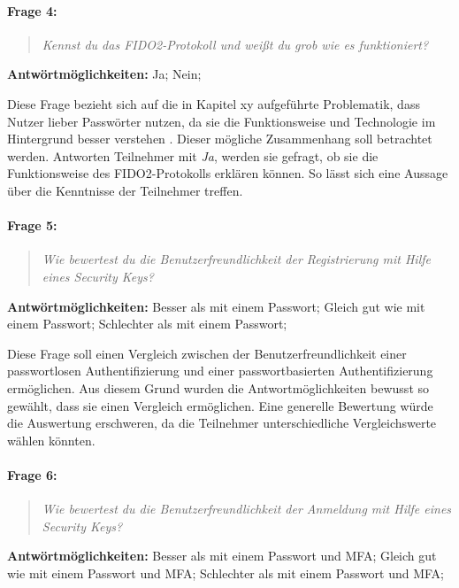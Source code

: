 \paragraph{Frage 4:}

\begin{quote}
    \textit{Kennst du das FIDO2-Protokoll und weißt du grob wie es funktioniert?}
\end{quote}

\textbf{Antwörtmöglichkeiten:} Ja; Nein;

Diese Frage bezieht sich auf die in Kapitel xy aufgeführte Problematik, dass Nutzer lieber Passwörter nutzen, da sie die Funktionsweise und Technologie im Hintergrund besser verstehen \cite{lyastani2020fido}. Dieser mögliche Zusammenhang soll betrachtet werden. Antworten Teilnehmer mit \textit{Ja}, werden sie gefragt, ob sie die Funktionsweise des FIDO2-Protokolls erklären können. So lässt sich eine Aussage über die Kenntnisse der Teilnehmer treffen. 

\paragraph{Frage 5:}

\begin{quote}
    \textit{Wie bewertest du die Benutzerfreundlichkeit der Registrierung mit Hilfe eines Security Keys?}
\end{quote}

\textbf{Antwörtmöglichkeiten:} Besser als mit einem Passwort; Gleich gut wie mit einem Passwort; Schlechter als mit einem Passwort;

Diese Frage soll einen Vergleich zwischen der Benutzerfreundlichkeit einer passwortlosen Authentifizierung und einer passwortbasierten Authentifizierung ermöglichen. Aus diesem Grund wurden die Antwortmöglichkeiten bewusst so gewählt, dass sie einen Vergleich ermöglichen. Eine generelle Bewertung würde die Auswertung erschweren, da die Teilnehmer unterschiedliche Vergleichswerte wählen könnten.

\paragraph{Frage 6:}

\begin{quote}
    \textit{Wie bewertest du die Benutzerfreundlichkeit der Anmeldung mit Hilfe eines Security Keys?}
\end{quote}

\textbf{Antwörtmöglichkeiten:} Besser als mit einem Passwort und \ac{MFA}; Gleich gut wie mit einem Passwort und \ac{MFA}; Schlechter als mit einem Passwort und \ac{MFA};

